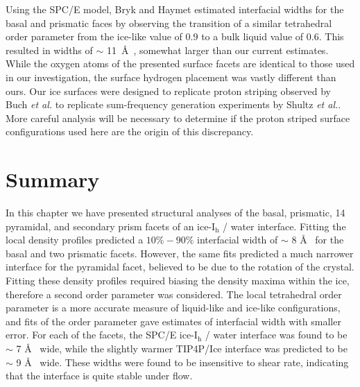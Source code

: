 Using the SPC/E model, Bryk and Haymet estimated interfacial widths
for the basal and prismatic faces by observing the transition of a
similar tetrahedral order parameter from the ice-like value of $0.9$
to a bulk liquid value of $0.6$.\cite{Bryk2004} This resulted in widths of
$\sim$ 11~\AA~, somewhat larger than our current estimates. While
the oxygen atoms of the presented surface facets are identical to
those used in our investigation, the surface hydrogen placement was
vastly different than ours. Our ice surfaces were designed to
replicate proton striping observed by Buch \textit{et al.} to
replicate sum-frequency generation experiments by Shultz \textit{et
  al.}.  More careful analysis will be necessary to determine if the
proton striped surface configurations used here are the origin of this
discrepancy.


\section{Summary}
In this chapter we have presented structural analyses of the basal,
prismatic, 14\degree~ pyramidal, and secondary prism facets of an
ice-I$_\mathrm{h}$ / water interface. Fitting the local density
profiles predicted a $10\%-90\%$ interfacial width of $\sim$ 8 \AA~
for the basal and two prismatic facets. However, the same fits
predicted a much narrower interface for the pyramidal facet, believed
to be due to the rotation of the crystal. Fitting these density
profiles required biasing the density maxima within the ice, therefore
a second order parameter was considered. The local tetrahedral order
parameter is a more accurate measure of liquid-like and ice-like
configurations, and fits of the order parameter gave estimates of
interfacial width with smaller error. For each of the facets, the
SPC/E ice-I$_\mathrm{h}$ / water interface was found to be $\sim$ 7
\AA~ wide, while the slightly warmer TIP4P/Ice interface was predicted
to be $\sim$ 9 \AA~ wide. These widths were found to be insensitive to
shear rate, indicating that the interface is quite stable under flow.
